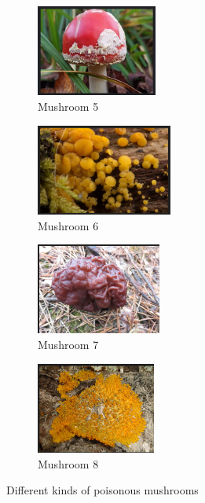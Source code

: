 \begin{figure}[!ht]
    \vspace{0.5cm} %
    
    \begin{subfigure}{0.23\textwidth} %
        \centering
        \includegraphics[height=3cm, width=\linewidth]{images/mushroom5.png}
        \caption{Mushroom 5} %
    \end{subfigure}
    \hfill
    \begin{subfigure}{0.23\textwidth} %
        \centering
        \includegraphics[height=3cm, width=\linewidth]{images/mushroom6.png}
        \caption{Mushroom 6} %
    \end{subfigure}
    \hfill
    \begin{subfigure}{0.23\textwidth} %
        \centering
        \includegraphics[height=3cm, width=\linewidth]{images/mushroom7.png}
        \caption{Mushroom 7} %
    \end{subfigure}
    \hfill
    \begin{subfigure}{0.23\textwidth} %
        \centering
        \includegraphics[height=3cm, width=\linewidth]{images/mushroom8.png}
        \caption{Mushroom 8} %
    \end{subfigure}
    
    \caption{Different kinds of poisonous mushrooms} %
\end{figure}




